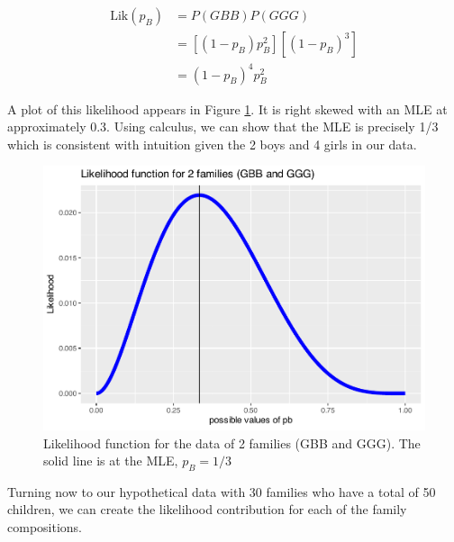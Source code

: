 \documentclass[
]{krantz}
\newcommand{\lik}{\mathrm{Lik}}
\begin{document}
\begin{align*}
 \lik (p_B) &= P(GBB)P(GGG) \\
            &= [(1-p_B)p_B^2][(1-p_B)^3] \\
            &= (1-p_B)^4p_B^2
\end{align*}

A plot of this likelihood appears in Figure \ref{fig:lik2}. It is right skewed with an MLE at approximately 0.3. Using calculus, we can show that the MLE is precisely 1/3 which is consistent with intuition given the 2 boys and 4 girls in our data.

\begin{figure}

{\centering \includegraphics[width=0.9\linewidth]{bookdown-BeyondMLR_files/figure-latex/lik2-1} 

}

\caption{Likelihood function for the data of 2 families (GBB and GGG). The solid line is at the MLE,  ${p}_B=1/3$}\label{fig:lik2}
\end{figure}

Turning now to our hypothetical data with 30 families who have a total of 50 children, we can create the likelihood contribution for each of the family compositions.
\end{document}
